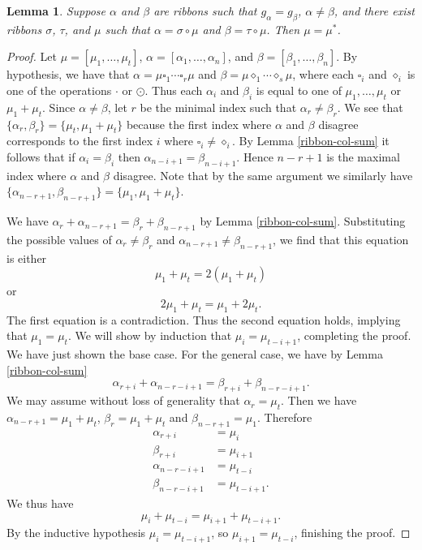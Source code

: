 \documentclass[12pt]{amsart}
\newtheorem{lem}[thm]{Lemma}
\theoremstyle{definition}
\begin{document}
\begin{lem}\label{factor_sym}
Suppose $\alpha$ and $\beta$ are ribbons such that $g_{\alpha} = g_{\beta}$, $\alpha \neq \beta$, and there exist ribbons $\sigma$, $\tau$, and $\mu$ such that $\alpha = \sigma \circ \mu$ and $\beta =  \tau \circ \mu$. Then $\mu = \mu^*$.
\end{lem}
\begin{proof}
Let $\mu = [\mu_1,\ldots,\mu_t]$, $\alpha = [\alpha_1,\ldots,\alpha_n]$, and $\beta = [\beta_1,\ldots,\beta_n]$. By hypothesis, we have that $\alpha = \mu \square_1 \cdots \square_r \mu$ and $\beta = \mu \diamond_1 \cdots \diamond_s \mu$, where each $\square_i$ and $\diamond_i$ is one of the operations $\cdot$ or $\odot$.  Thus each $\alpha_i$ and $\beta_i$ is equal to one of $\mu_1,\ldots,\mu_t$ or $\mu_1 + \mu_t$. Since $\alpha \neq \beta$, let $r$ be the minimal index such that $\alpha_r \neq \beta_r$. We see that $\{\alpha_r,\beta_r\} = \{\mu_t,\mu_1 + \mu_t \}$ because the first index where $\alpha$ and $\beta$ disagree corresponds to the first index $i$ where $\square_i \neq \diamond_i$. By Lemma \ref{ribbon-col-sum} it follows that if $\alpha_i = \beta_i$ then $\alpha_{n-i+1} = \beta_{n-i+1}$. Hence $n-r+1$ is the maximal index where $\alpha$ and $\beta$ disagree. Note that by the same argument we similarly have $\{\alpha_{n-r+1},\beta_{n-r+1}\} = \{\mu_1,\mu_1 + \mu_t \}$. 

We have $\alpha_r + \alpha_{n-r+1} = \beta_r + \beta_{n-r+1}$ by Lemma \ref{ribbon-col-sum}. Substituting the possible values of $\alpha_r \neq \beta_r$ and $\alpha_{n-r+1} \neq \beta_{n-r+1}$, we find that this equation is either
$$\mu_1 + \mu_t = 2(\mu_1 + \mu_t)$$
or
$$2\mu_1 + \mu_t = \mu_1 + 2\mu_t.$$
The first equation is a contradiction. Thus the second equation holds, implying that $\mu_1 = \mu_t$. We will show by induction that $\mu_i = \mu_{t - i + 1}$, completing the proof. We have just shown the base case. For the general case, we have by Lemma \ref{ribbon-col-sum}
$$\alpha_{r + i} + \alpha_{n - r - i + 1} = \beta_{r + i} + \beta_{n - r - i + 1}.$$
We may assume without loss of generality that $\alpha_r = \mu_t$. Then we have $\alpha_{n - r + 1} = \mu_1 + \mu_t$, $\beta_r = \mu_1 + \mu_t$ and $\beta_{n - r + 1} = \mu_1$. Therefore 
\begin{equation*}
\begin{aligned}
\alpha_{r + i} &= \mu_i \\
\beta_{r + i} &= \mu_{i + 1} \\
\alpha_{n - r - i + 1} &= \mu_{t - i} \\
\beta_{n - r - i + 1} &= \mu_{t - i + 1}.
\end{aligned}
\end{equation*}
We thus have
$$\mu_i + \mu_{t - i} = \mu_{i + 1} + \mu_{t - i +1}.$$
By the inductive hypothesis $\mu_i = \mu_{t - i + 1}$, so $\mu_{i + 1} = \mu_{t - i}$, finishing the proof.
\end{proof}
\end{document}
